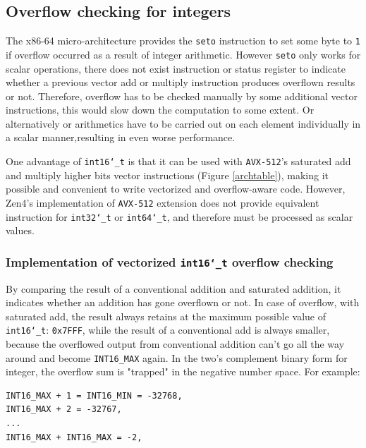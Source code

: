 \documentclass[logo,bsc,singlespacing,parskip]{infthesis}
\newcommand{\dtshort}{\texttt{int16\char`_t}}
\newcommand{\dtint}{\texttt{int32\char`_t}}
\newcommand{\dtlong}{\texttt{int64\char`_t}}
\begin{document}
\subsection{Overflow checking for integers}
\label{sec:overflow-int}

The x86-64 micro-architecture provides the \texttt{seto} instruction to set some
byte to \texttt{1} if overflow occurred as a result of integer arithmetic.
However \texttt{seto} only works for scalar operations, there does not exist
instruction or status register to indicate whether a previous vector add or
multiply instruction produces overflown results or not. Therefore, overflow has
to be checked manually by some additional vector instructions, this would slow
down the computation to some extent. Or alternatively or arithmetics have to be
carried out on each element individually in a scalar manner,resulting in even
worse performance. 



One advantage of \dtshort{} is that it can be used with \texttt{AVX-512}'s
saturated add and multiply higher bits vector instructions (Figure 
\ref{archtable}), making it possible and convenient to write vectorized and
overflow-aware code. However, Zen4's implementation of \texttt{AVX-512} extension does
not provide equivalent instruction for \dtint{} or \dtlong{},
and therefore must be processed as scalar values.


\subsubsection{Implementation of vectorized \dtshort{} overflow checking}
\label{sec:i16-overflow-checking}
By comparing the result of a conventional addition and saturated addition, it
indicates whether an addition has gone overflown or not. In case of overflow,
with saturated add, the result always retains at the maximum possible value of
\dtshort{}: \texttt{0x7FFF}, while the result of a conventional add is
always smaller, because the overflowed output from conventional addition can't
go all the way around and become \texttt{INT16\_MAX} again. In the two's
complement binary form for integer, the overflow sum is "trapped" in the
negative number space. For example: 
\begin{verbatim}
INT16_MAX + 1 = INT16_MIN = -32768, 
INT16_MAX + 2 = -32767, 
...
INT16_MAX + INT16_MAX = -2, 
\end{verbatim}
\end{document}
